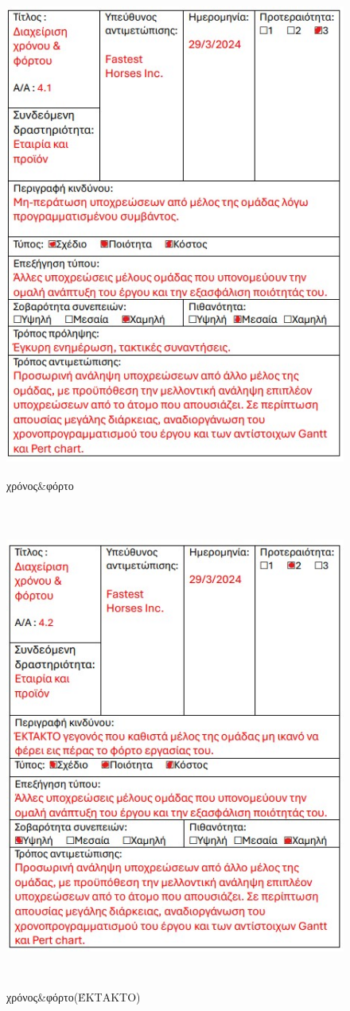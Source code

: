 \begin{figure}[!htb]
  \centering
    \centering
    \includegraphics[width=\textwidth,height=16cm]{risk4_1.jpg}
    \caption{χρόνος\&φόρτο}
    \label{}
\end{figure}
\begin{figure}[!htb]
  \centering
    \centering
    \includegraphics[width=\textwidth,height=16cm]{risk4_2.jpg}
    \caption{χρόνος\&φόρτο(ΈΚΤΑΚΤΟ)}
    \label{}
\end{figure}
